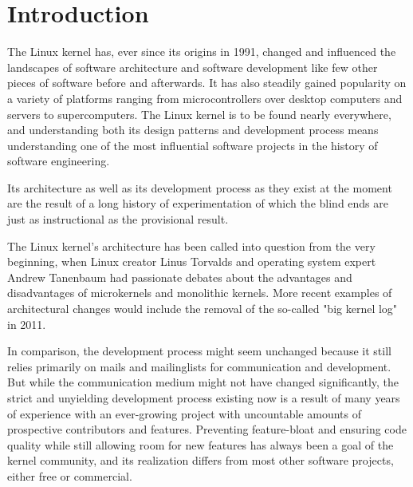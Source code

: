 \documentclass{sig-alternate-05-2015}
\begin{document}


\printccsdesc{}


\section{Introduction}

The Linux kernel has, ever since its origins in 1991, changed and influenced the landscapes of software architecture and software development like few other pieces of software before and afterwards.
It has also steadily gained popularity on a variety of platforms ranging from microcontrollers over desktop computers and servers to supercomputers.
The Linux kernel is to be found nearly everywhere, and understanding both its design patterns and development process means understanding one of the most influential software projects in the history of software engineering.

Its architecture as well as its development process as they exist at the moment are the result of a long history of experimentation of which the blind ends are just as instructional as the provisional result.

The Linux kernel's architecture has been called into question from the very beginning, when Linux creator Linus Torvalds and operating system expert Andrew Tanenbaum had passionate debates about the advantages and disadvantages of microkernels and monolithic kernels.
More recent examples of architectural changes would include the removal of the so-called "big kernel log" in 2011.

In comparison, the development process might seem unchanged because it still relies primarily on mails and mailinglists for communication and development.
But while the communication medium might not have changed significantly, the strict and unyielding development process existing now is a result of many years of experience with an ever-growing project with uncountable amounts of prospective contributors and features.
Preventing feature-bloat and ensuring code quality while still allowing room for new features has always been a goal of the kernel community, and its realization differs from most other software projects, either free or commercial.
\end{document}
